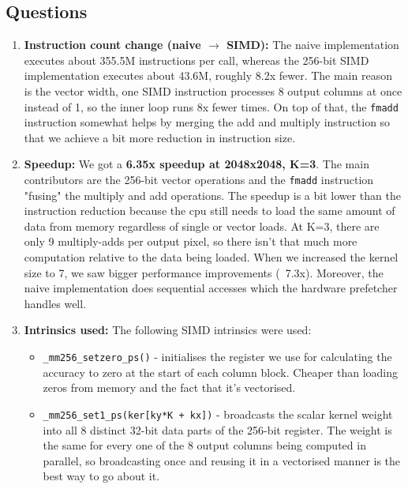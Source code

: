 \documentclass[11pt]{article}
\begin{document}
\subsection{Questions}
\begin{enumerate}[leftmargin=1.6em, itemsep=0.3em]
    \item \textbf{Instruction count change (naive $\to$ SIMD):} The naive implementation executes about 355.5M instructions per call, whereas
    the 256-bit SIMD implementation executes about 43.6M, roughly 8.2x fewer.\newline
    The main reason is the vector width, one SIMD instruction processes 8 output columns at once instead of 1,
    so the inner loop runs 8x fewer times. On top of that, the \texttt{fmadd} instruction somewhat helps by merging
    the add and multiply instruction so that we achieve a bit more reduction in instruction size.
    \item \textbf{Speedup:} We got a \textbf{6.35x speedup at 2048x2048, K=3}. The main contributors are the 256-bit vector operations and the \texttt{fmadd} instruction
    "fusing" the multiply and add operations.\newline
    The speedup is a bit lower than the instruction reduction because the cpu still needs to load 
    the same amount of data from memory regardless of single or vector loads. At K=3, there are only 9 multiply-adds per output pixel, so there
    isn't that much more computation relative to the data being loaded. When we increased the kernel size to 7, we saw bigger performance improvements (~7.3x).
    Moreover, the naive implementation does sequential accesses which the hardware prefetcher handles well. 
    \item \textbf{Intrinsics used:} The following SIMD intrinsics
    were used:
    \begin{itemize}[leftmargin=1.4em, itemsep=0.2em]
        \item \texttt{\_mm256\_setzero\_ps()} - initialises the register we use for calculating the accuracy
        to zero at the start of each column block. Cheaper than loading
        zeros from memory and the fact that it's vectorised.
        \item \texttt{\_mm256\_set1\_ps(ker[ky*K + kx])} - broadcasts the
        scalar kernel weight into all 8 distinct 32-bit data parts of the 256-bit register. The weight is the same for every
        one of the 8 output columns being computed in parallel, so broadcasting
        once and reusing it in a vectorised manner is the best way to go about it.

\end{itemize}
\end{enumerate}
\end{document}
